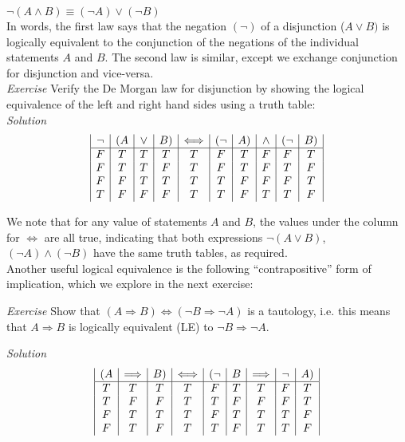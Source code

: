 $\neg\left(A \land B \right) \equiv \left(\neg A\right) \lor \left(\neg B \right)$ \\

In words, the first law says that the negation $(\neg)$ of a disjunction ($A \lor B)$ is logically equivalent to the conjunction of the negations of the individual statements $A$ and $B$.  The second law is similar, except we exchange conjunction for disjunction and vice-versa.\\

\textit{Exercise}
Verify the De Morgan law for disjunction by showing the logical equivalence of the left and right hand sides using a truth table:\\
\textit{Solution}\\


\begin{displaymath}
\begin{array}{| c | c | c | c | c | c | c | c | c | c |}
\neg & (A & \lor  & B) & \Longleftrightarrow & (\neg & A) & \land & (\neg & B) \\
\hline
F & T & T & T & T & F & T & F & F & T \\
F & T & T & F & T & F & T & F & T & F \\
F & F & T & T & T & T & F & F & F & T \\
T & F & F & F & T & T & F & T & T & F \\
\end{array}
\end{displaymath}

We note that for any value of statements $A$ and $B$, the values under the column for $\Longleftrightarrow$ are all true, indicating that both expressions $\neg\left(A \lor B \right)$, $\left(\neg A\right) \land \left(\neg B \right)$ have the same truth tables, as required.\\

Another useful logical equivalence is the following ``contrapositive'' form of implication, which we explore in the next exercise:

\textit{Exercise}
Show that $\left(A \Longrightarrow B \right) \Longleftrightarrow \left(\neg B \Longrightarrow \neg A\right)$ is a tautology, i.e. this means that $A \Longrightarrow B $ is logically equivalent (LE) to $\neg B \Longrightarrow \neg A$.

\textit{Solution}\\

\begin{displaymath}
\begin{array}{| c | c | c | c | c | c | c | c | c |}
(A & \Longrightarrow & B)& \Longleftrightarrow & (\neg & B & \Longrightarrow & \neg & A) \\
\hline
T & T & T & T & F & T & T & F &T \\
T & F & F & T & T & F & F & F & T \\
F & T & T & T & F & T & T & T & F \\
F & T & F & T & T & F & T & T & F \\
\end{array}
\end{displaymath}


